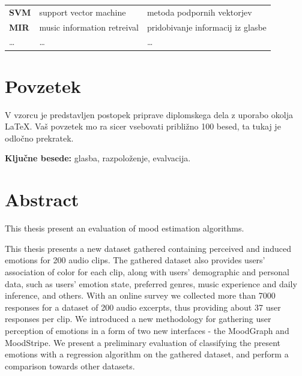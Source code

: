 \documentclass[a4paper, 12pt]{book}
\newcommand{\tkeywords}{glasba, razpoloženje, evalvacija}
\newcommand{\clearemptydoublepage}{\newpage{\pagestyle{empty}\cleardoublepage}}
\begin{document}
{\begin{tabular}{l|l|l}
  
  {\bf SVM} & support vector machine & metoda podpornih vektorjev \\
  {\bf MIR} & music information retreival & pridobivanje informacij iz glasbe \\
  \dots & \dots & \dots \\
\end{tabular}



\clearemptydoublepage

\chapter*{Povzetek}
V vzorcu je predstavljen postopek priprave diplomskega dela z uporabo okolja \LaTeX. Vaš povzetek mo ra sicer vsebovati približno 100 besed, ta tukaj je odločno prekratek.
\bigskip

\noindent\textbf{Ključne besede:} \tkeywords.
\clearemptydoublepage

\chapter*{Abstract}

This thesis present an evaluation of mood estimation algorithms. 

This thesis presents a new dataset gathered containing perceived and induced emotions for 200 audio clips. The gathered dataset also provides users' association of color for each clip, along with users' demographic and personal data, such as users' emotion state, preferred genres, music experience and daily inference, and others. With an online survey we collected more than 7000 responses for a dataset of 200 audio excerpts, thus providing about 37 user responses per clip. We introduced a new methodology for gathering user perception of emotions in a form of two new interfaces - the MoodGraph and MoodStripe. We present a preliminary evaluation of classifying the present emotions with a regression algorithm on the gathered dataset, and perform a comparison towards other datasets.

\bigskip

}
\end{document}
